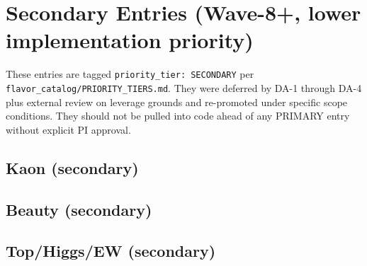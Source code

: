 \documentclass[11pt]{article}
\begin{document}


\section{Secondary Entries (Wave-8+, lower implementation priority)}

These entries are tagged \texttt{priority\_tier: SECONDARY} per
\texttt{flavor\_catalog/PRIORITY\_TIERS.md}. They were deferred by DA-1
through DA-4 plus external review on leverage grounds and re-promoted
under specific scope conditions. They should not be pulled into code
ahead of any PRIMARY entry without explicit PI approval.

\subsection*{Kaon (secondary)}


\subsection*{Beauty (secondary)}


\subsection*{Top/Higgs/EW (secondary)}

\end{document}

